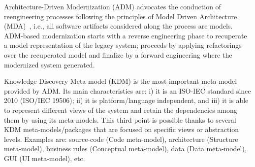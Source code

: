 





Architecture-Driven Modernization (ADM) advocates the conduction of reengineering processes following the principles of Model Driven Architecture (MDA)~\cite{1686216, Heckel2008, 7051941, IRIDurelliCatalogo}, i.e., all software artifacts considered along the process are models. ADM-based modernization starts with a reverse engineering phase to recuperate a model representation of the legacy system; proceeds by applying refactorings over the recuperated model and finalize by a forward engineering where the modernized system generated.

Knowledge Discovery Meta-model (KDM) is the most important meta-model provided by ADM. Its main characteristics are: i) it is an ISO-IEC standard since 2010 (ISO/IEC 19506); ii) it is platform/language independent, and iii) it is able to represent different views of the system and retain the dependencies among them by using its meta-models. This third point is possible thanks to several KDM meta-models/packages that are focused on specific views or abstraction levels. Examples are:  source-code (Code meta-model), architecture (Structure meta-model), business rules (Conceptual meta-model), data (Data meta-model), GUI (UI meta-model), etc.

